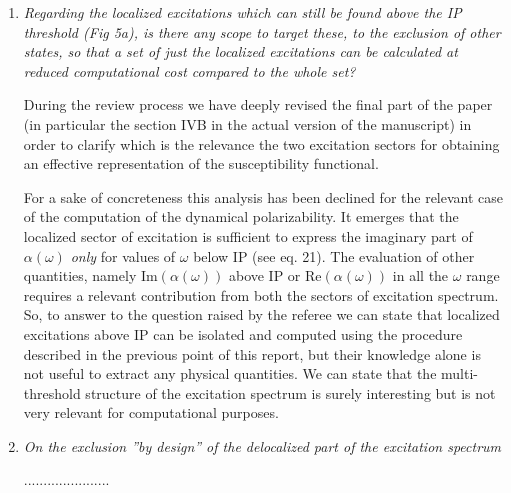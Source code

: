 \documentclass[11pt,a4paper]{article}
\begin{document}
\begin{enumerate}
\item \emph{Regarding the localized excitations which can still be found above the IP threshold (Fig 5a), is there any scope to target these, to the
exclusion of other states, so that a set of just the localized excitations can be calculated at reduced computational cost compared to the whole set?}

 During the review process we have deeply revised the final part of the paper (in particular the section IVB in the actual version of the manuscript) in order to clarify which is the relevance the two excitation sectors for obtaining an effective representation of the susceptibility functional.

 For a sake of concreteness this analysis has been declined for the relevant case of the computation of the dynamical polarizability. It emerges that the localized
 sector of excitation is sufficient to express the imaginary part of $\alpha(\omega)$ \emph{only} for values of $\omega$ below IP (see eq. 21). The evaluation of
 other quantities, namely $\mathrm{Im}(\alpha(\omega))$ above IP or $\mathrm{Re}(\alpha(\omega))$ in all the $\omega$ range requires a relevant contribution from
 both the sectors of excitation spectrum. So, to answer to the question raised by the referee we can state that localized excitations above IP can be isolated and computed using the procedure described in the previous point of this report, but their knowledge alone is not useful to extract any physical quantities.
 We can state that the multi-threshold structure of the excitation spectrum is surely interesting but is not very relevant for computational purposes.

 \item \emph{On the exclusion ''by design'' of the delocalized part of the excitation spectrum}

 ......................


\end{enumerate}
\end{document}
